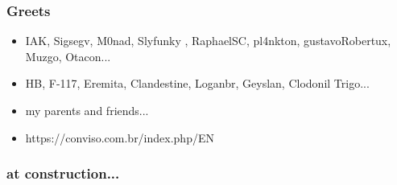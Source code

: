 \documentclass[serif,mathserif]{beamer}
\begin{document}
\begin{frame}
  \frametitle{Greets}
  \begin{itemize}
  \item IAK, Sigsegv, M0nad, Slyfunky , RaphaelSC, pl4nkton, gustavoRobertux, Muzgo, Otacon...
  \item HB, F-117, Eremita, Clandestine, Loganbr, Geyslan, Clodonil Trigo...
  \item my parents and friends...
  \item https://conviso.com.br/index.php/EN
  \end{itemize}
\end{frame}

\begin{frame}
  \frametitle{at construction...}
\end{frame}
\end{document}
